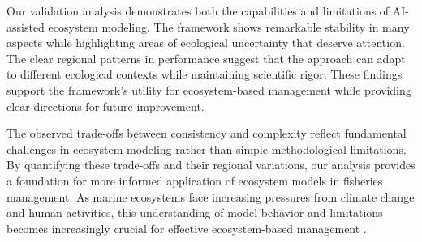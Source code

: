 Our validation analysis demonstrates both the capabilities and limitations of AI-assisted ecosystem modeling. The framework shows remarkable stability in many aspects while highlighting areas of ecological uncertainty that deserve attention. The clear regional patterns in performance suggest that the approach can adapt to different ecological contexts while maintaining scientific rigor. These findings support the framework's utility for ecosystem-based management while providing clear directions for future improvement.

The observed trade-offs between consistency and complexity reflect fundamental challenges in ecosystem modeling rather than simple methodological limitations. By quantifying these trade-offs and their regional variations, our analysis provides a foundation for more informed application of ecosystem models in fisheries management. As marine ecosystems face increasing pressures from climate change and human activities, this understanding of model behavior and limitations becomes increasingly crucial for effective ecosystem-based management \citep{Geary2020}.
